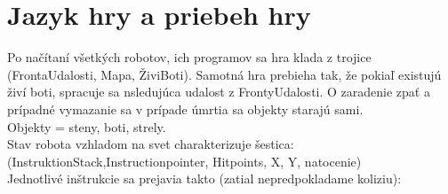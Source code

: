 \documentclass[a4paper,11pt,final]{report}
\begin{document}
\section{Jazyk hry a priebeh hry} %
Po načítaní všetkých robotov, ich programov sa hra klada z trojice (FrontaUdalosti, Mapa, ŽiviBoti). Samotná hra prebieha tak, že pokiaľ existujú živí boti, spracuje sa nsledujúca udalost z FrontyUdalosti. O zaradenie zpať a prípadné vymazanie sa v prípade úmrtia sa objekty starajú sami.\\
Objekty = steny, boti, strely. \\
Stav robota vzhladom na svet charakterizuje šestica: (InstruktionStack,Instructionpointer, Hitpoints, X, Y, natocenie)\\
Jednotlivé inštrukcie sa prejavia takto (zatial nepredpokladame koliziu):\\
\end{document}
